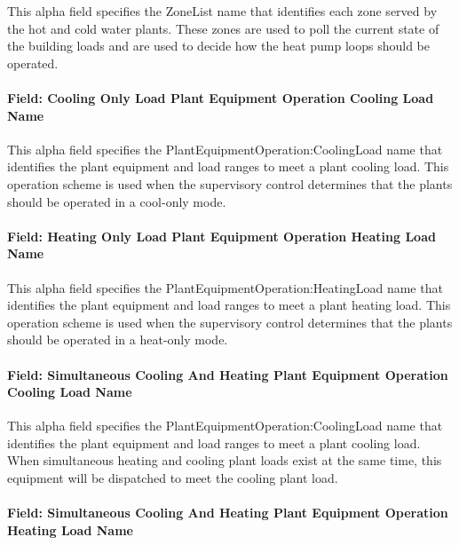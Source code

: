 This alpha field specifies the ZoneList name that identifies each zone served by the hot and cold water plants. These zones are used to poll the current state of the building loads and are used to decide how the heat pump loops should be operated. 

\paragraph{Field: Cooling Only Load Plant Equipment Operation Cooling Load Name}\label{field-cool-only-load-equip-operation-name-plantequipmentoperationchillerheaterchangeover}

This alpha field specifies the PlantEquipmentOperation:CoolingLoad name that identifies the plant equipment and load ranges to meet a plant cooling load. This operation scheme is used when the supervisory control determines that the plants should be operated in a cool-only mode. 

\paragraph{Field: Heating Only Load Plant Equipment Operation Heating Load Name}\label{field-heat-only-load-equip-operation-name-plantequipmentoperationchillerheaterchangeover}

This alpha field specifies the PlantEquipmentOperation:HeatingLoad name that identifies the plant equipment and load ranges to meet a plant heating load. This operation scheme is used when the supervisory control determines that the plants should be operated in a heat-only mode. 

\paragraph{Field: Simultaneous Cooling And Heating Plant Equipment Operation Cooling Load Name}\label{field-simulataneous-cooling-and-heating-plant-equip-operation-cooling-name-plantequipmentoperationchillerheaterchangeover}

This alpha field specifies the PlantEquipmentOperation:CoolingLoad name that identifies the plant equipment and load ranges to meet a plant cooling load. When simultaneous heating and cooling plant loads exist at the same time, this equipment will be dispatched to meet the cooling plant load.

\paragraph{Field: Simultaneous Cooling And Heating Plant Equipment Operation Heating Load Name}\label{field-simulataneous-cooling-and-heating-plant-equip-operation-heating-name-plantequipmentoperationchillerheaterchangeover}

